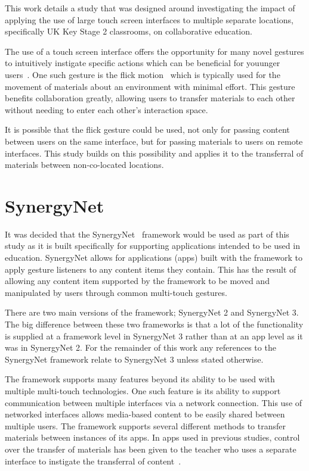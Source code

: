 \documentclass[a4paper,11pt]{article}
\begin{document}
This work details a study that was designed around investigating the impact of applying the use of large touch screen interfaces to multiple separate locations, specifically UK Key Stage 2 classrooms, on collaborative education.

The use of a touch screen interface offers the opportunity for many novel gestures to intuitively instigate specific actions which can be beneficial for youunger users~\cite{kim:2007,wu:2003,rick:2009}.
One such gesture is the flick motion~\cite{reetz-et-al:2006} which is typically used for the movement of materials about an environment with minimal effort.
This gesture benefits collaboration greatly, allowing users to transfer materials to each other without needing to enter each other's interaction space.
 
It is possible that the flick gesture could be used, not only for passing content between users on the same interface, but for passing materials to users on remote interfaces.
This study builds on this possibility and applies it to the transferral of materials between non-co-located locations.


\section{SynergyNet}

It was decided that the SynergyNet~\cite{alagha-et-al:2010,higgins-et-al:2011} framework would be used as part of this study as it is built specifically for supporting applications intended to be used in education.
SynergyNet allows for applications (apps) built with the framework to apply gesture listeners to any content items they contain.
This has the result of allowing any content item supported by the framework to be moved and manipulated by users through common multi-touch gestures.

There are two main versions of the framework; SynergyNet 2 and SynergyNet 3.
The big difference between these two frameworks is that a lot of the functionality is supplied at a framework level in SynergyNet 3 rather than at an app level as it was in SynergyNet 2.
For the remainder of this work any references to the SynergyNet framework relate to SynergyNet 3 unless stated otherwise.

The framework supports many features beyond its ability to be used with multiple multi-touch technologies.
One such feature is its ability to support communication between multiple interfaces via a network connection.
This use of networked interfaces allows media-based content to be easily shared between multiple users.
The framework supports several different methods to transfer materials between instances of its apps.
In apps used in previous studies, control over the transfer of materials has been given to the teacher who uses a separate interface to instigate the transferral of content~\cite{alagha-et-al:2010,mercier:2016}.
\end{document}
